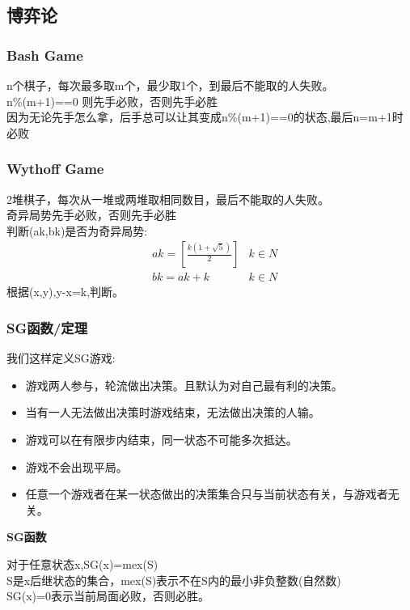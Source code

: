 \documentclass{article}
\begin{document}
\subsection{博弈论}

\subsubsection{Bash Game}

n个棋子，每次最多取m个，最少取1个，到最后不能取的人失败。\\
n\%(m+1)==0 则先手必败，否则先手必胜	\\
因为无论先手怎么拿，后手总可以让其变成n\%(m+1)==0的状态,最后n=m+1时必败	\\

\subsubsection{Wythoff Game}

2堆棋子，每次从一堆或两堆取相同数目，最后不能取的人失败。	\\
奇异局势先手必败，否则先手必胜							 \\
判断(ak,bk)是否为奇异局势:							 \\
$$\begin{aligned}
&ak = [\frac{k(1+\sqrt{5})}{2}] &  k \in N \\
&bk = ak + k                    &  k \in N
\end{aligned}
$$
根据(x,y),y-x=k,判断。	\\

\subsubsection{SG函数/定理}

我们这样定义SG游戏:
\begin{itemize}
\item 游戏两人参与，轮流做出决策。且默认为对自己最有利的决策。
\item 当有一人无法做出决策时游戏结束，无法做出决策的人输。
\item 游戏可以在有限步内结束，同一状态不可能多次抵达。
\item 游戏不会出现平局。
\item 任意一个游戏者在某一状态做出的决策集合只与当前状态有关，与游戏者无关。
\end{itemize}

\textbf{SG函数}

对于任意状态x,SG(x)=mex(S)	\\
S是x后继状态的集合，mex(S)表示不在S内的最小非负整数(自然数)	\\
SG(x)=0表示当前局面必败，否则必胜。
\end{document}
